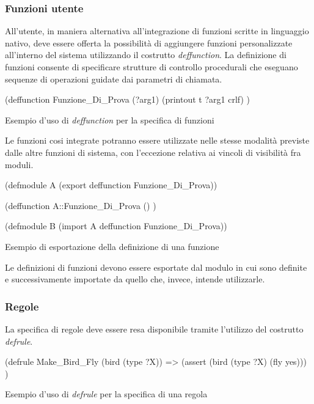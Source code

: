 \subsubsection{Funzioni utente}\label{par:linguaggio-funzioni}
All'utente, in maniera alternativa all'integrazione di funzioni scritte in linguaggio nativo, deve essere offerta la possibilità di aggiungere funzioni personalizzate all'interno del sistema utilizzando il costrutto \emph{deffunction}. La definizione di funzioni consente di specificare strutture di controllo procedurali che eseguano sequenze di operazioni guidate dai parametri di chiamata.

\begin{program}
\begin{verbatimtab}

(deffunction Funzione_Di_Prova (?arg1)
	(printout t ?arg1 crlf)
)
\end{verbatimtab}
\caption{Esempio d'uso di \emph{deffunction} per la specifica di funzioni}
\end{program}


Le funzioni cosi integrate potranno essere utilizzate nelle stesse modalità previste dalle altre funzioni di sistema, con l'eccezione relativa ai vincoli di visibilità fra moduli.

\begin{program}
\begin{verbatimtab}

(defmodule A
	(export deffunction Funzione_Di_Prova))
	
(deffunction A::Funzione_Di_Prova () )

(defmodule B
	(import A deffunction Funzione_Di_Prova))
\end{verbatimtab}
\caption{Esempio di esportazione della definizione di una funzione}
\end{program}

Le definizioni di funzioni devono essere esportate dal modulo in cui sono definite e successivamente importate da quello che, invece, intende utilizzarle.

\subsubsection{Regole}\label{par:linguaggio-regole}
La specifica di regole deve essere resa disponibile tramite l'utilizzo del costrutto \emph{defrule}.

\begin{program}
\begin{verbatimtab}

(defrule Make_Bird_Fly
	(bird (type ?X))
	=>
	(assert (bird (type ?X)	(fly yes)))
)
\end{verbatimtab}
\caption{Esempio d'uso di \emph{defrule} per la specifica di una regola}\label{code:defrule}
\end{program}

